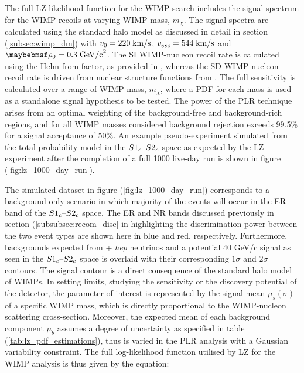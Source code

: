 The full LZ likelihood function for the WIMP search includes the signal spectrum for the WIMP recoils at varying WIMP mass, $m_{\chi}$. The signal spectra are calculated using the standard halo model as discussed in detail in section (\ref{subsec:wimp_dm}) with $v_{0} = 220 \; \text{km/s}$, $v_{esc} = 544 \; \text{km/s}$ and $\rho_{0} = 0.3 \; \MathText{GeV/c}^2$. The SI WIMP-nucleon recoil rate is calculated using the Helm from factor, as provided in \cite{PhysRev.104.1466}, whereas the SD WIMP-nucleon recoil rate is driven from nuclear structure functions from \cite{PhysRevD.88.083516}. The full sensitivity is calculated over a range of WIMP mass, $m_{\chi}$, where a PDF for each mass is used as a standalone signal hypothesis to be tested. The power of the PLR technique arises from an optimal weighting of the background-free and background-rich regions, and for all WIMP masses considered background rejection exceeds 99.5\% for a signal acceptance of 50\%. An example pseudo-experiment simulated from the total probability model in the $S1_{c}\text{--}{}S2_{c}$ space as expected by the LZ experiment after the completion of a full 1000 live-day run is shown in figure (\ref{fig:lz_1000_day_run}). 

The simulated dataset in figure (\ref{fig:lz_1000_day_run}) corresponds to a background-only scenario in which majority of the events will occur in the ER band of the $S1_{c}\text{--}{}S2_{c}$ space. The ER and NR bands discussed previously in section (\ref{subsubsec:recom_disc} in highlighting the discrimination power between the two event types are shown here in blue and red, respectively. Furthermore, backgrounds expected from \BE{} + \textit{hep} neutrinos and a potential 40 GeV/c\squared{} signal as seen in the $S1_{c}\text{--}{}S2_{c}$ space is overlaid with their corresponding $1\sigma$ and $2\sigma$ contours. The signal contour is a direct consequence of the standard halo model of WIMPs. In setting limits, studying the sensitivity or the discovery potential of the detector, the parameter of interest is represented by the signal mean $\mu_{s}(\sigma)$ of a specific WIMP mass, which is directly proportional to the WIMP-nucleon scattering cross-section. Moreover, the expected mean of each background component $\mu_{b}$ assumes a degree of uncertainty as specified in table (\ref{tab:lz_pdf_estimations}), thus is varied in the PLR analysis with a Gaussian variability constraint. The full log-likelihood function utilised by LZ for the WIMP analysis is thus given by the equation:

